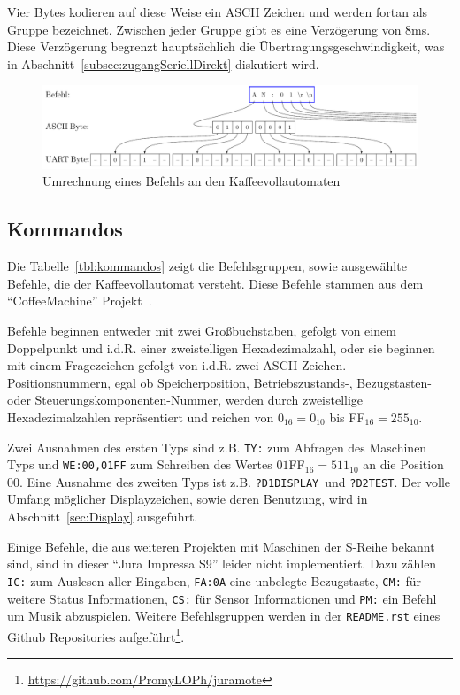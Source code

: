 Vier Bytes kodieren auf diese Weise ein \ac{ASCII} Zeichen und werden fortan als Gruppe bezeichnet.
Zwischen jeder Gruppe gibt es eine Verzögerung von 8ms.
Diese Verzögerung begrenzt hauptsächlich die Übertragungsgeschwindigkeit, was in Abschnitt~\ref{subsec:zugangSeriellDirekt} diskutiert wird.

\begin{figure}
  \begin{center}
    \includegraphics[scale=0.6]{images/chapter_3/UART-Bytes}
    \caption{Umrechnung eines Befehls an den Kaffeevollautomaten}
    \label{fig:uart}
  \end{center}
\end{figure}

\subsection{Kommandos}\label{subsec:Kommandos}
Die Tabelle~\ref{tbl:kommandos} zeigt die Befehlsgruppen, sowie ausgewählte Befehle, die der Kaffeevollautomat versteht.
Diese Befehle stammen aus dem "`CoffeeMachine"' Projekt~\cite{GitCoffeeMachine}.

Befehle beginnen entweder mit zwei Großbuchstaben, gefolgt von einem Doppelpunkt und i.d.R. einer zweistelligen Hexadezimalzahl, oder sie beginnen mit einem Fragezeichen gefolgt von i.d.R. zwei \ac{ASCII}-Zeichen.
Positionsnummern, egal ob Speicherposition, \mbox{Betriebszustands-,} Bezugstasten- oder Steuerungskomponenten-Nummer, werden durch zweistellige Hexadezimalzahlen repräsentiert und reichen von $0_{16}=0_{10}$ bis FF$_{16}=255_{10}$.

Zwei Ausnahmen des ersten Typs sind z.B. \texttt{TY:} zum Abfragen des Maschinen Typs und \texttt{WE:00,01FF} zum Schreiben des Wertes $01$FF$_{16} = 511_{10}$ an die Position $00$.
Eine Ausnahme des zweiten Typs ist z.B. \texttt{?D1DISPLAY}\textvisiblespace\ und \texttt{?D2}\textvisiblespace\textvisiblespace\texttt{TEST}\textvisiblespace\textvisiblespace.
Der volle Umfang möglicher Displayzeichen, sowie deren Benutzung, wird in Abschnitt~\ref{sec:Display} ausgeführt.

Einige Befehle, die aus weiteren Projekten mit Maschinen der S-Reihe bekannt sind, sind in dieser "`Jura Impressa S9"' leider nicht implementiert.
Dazu zählen \texttt{IC:} zum Auslesen aller Eingaben, \texttt{FA:0A} eine unbelegte Bezugstaste, \texttt{CM:} für weitere Status Informationen, \texttt{CS:} für Sensor Informationen und \texttt{PM:} ein Befehl um Musik abzuspielen.
Weitere Befehlsgruppen werden in der \texttt{README.rst} eines Github Repositories aufgeführt\footnote{\url{https://github.com/PromyLOPh/juramote}}.

